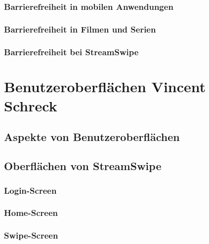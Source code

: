 \documentclass[11pt,a4paper]{article}
\begin{document}
\subsubsection{Barrierefreiheit in mobilen Anwendungen}


\subsubsection{Barrierefreiheit in Filmen und Serien}


\subsubsection{Barrierefreiheit bei StreamSwipe}
\label{sec:bf-streamswipe}



\section[Benutzeroberflächen]{Benutzeroberflächen \hfill \normalfont \small{Vincent Schreck}}


\subsection{Aspekte von Benutzeroberflächen}
\label{sec:UI-Aspekte}


\subsection{Oberflächen von StreamSwipe}


\subsubsection{Login-Screen}
\label{sec:loginscreen}



\subsubsection{Home-Screen}
\label{sec:homescreen}



\subsubsection{Swipe-Screen}
\label{sec:swipescreen}

\end{document}
